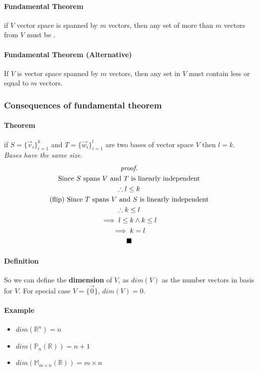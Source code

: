 \documentclass[11pt]{article}
\begin{document}
	\paragraph{Fundamental Theorem} if $V$ vector space is spanned by $m$ vectors, then any set of more than $m$ vectors from $V$ must be .
	
	\paragraph{Fundamental Theorem (Alternative)} If $V$ is vector space spanned by $m$ vectors, then any  set in $V$ must contain less or equal to $m$ vectors.
	
	\subsubsection{Consequences of fundamental theorem}
	
	\paragraph{Theorem} if $S = \{\vec{v}_i\}_{i=1}^k$ and $T = \{\vec{w}_i\}_{i=1}^l$ are two bases of vector space $V$ then $l = k$.
	\emph{Bases have the same size.}
	\begin{multline*}
	\emph{proof.}\\
		\text{Since $S$ spans $V$ and $T$ is linearly independent} \\
		\therefore l \leq k \\
		\text{(flip) Since $T$ spans $V$ and $S$ is linearly independent} \\
		\therefore k \leq l \\
		\implies l \leq k \land k \leq l \\
		\implies k = l \\
		\blacksquare
	\end{multline*}
	
	\paragraph{Definition} So we can define the \textbf{dimension} of $V$, as $dim(V)$ as the number vectors in  basis for $V$. For special case $V = \{\vec{0}\}$, $dim(V) = 0$.
	\paragraph{Example}
	\begin{itemize}
		\item $dim(\mathbb{R}^n) = n$
		\item $dim(\mathbb{P}_n(\mathbb{R})) = n + 1$
		\item $dim(\mathbb{M}_{m \times n}(\mathbb{R})) = m\times n$
	\end{itemize}
	
\end{document}

